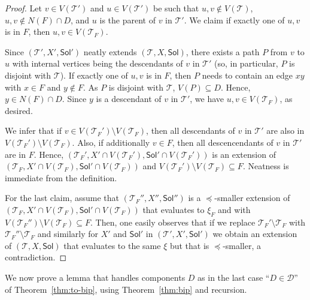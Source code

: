 \documentclass[11pt,a4paper]{article}
\theoremstyle{definition}
\def\T{\mathcal{T}}
\def\Sol{\mathsf{Sol}}
\begin{document}
 \begin{proof}
 Let $v \in V(\T')$ and $u \in V(\T')$ be such that $u,v \notin V(\T)$,
 $u,v \notin N(F) \cap D$, and $u$ is the parent of $v$ in $\T'$. 
 We claim if exactly one of $u,v$ is in $F$, then $u,v \in V(\T_F)$. 

 Since $(\T',X',\Sol')$ neatly extends $(\T,X,\Sol)$,
 there exists a path $P$ from $v$ to $u$ with internal vertices
 being the descendants of $v$ in $\T'$ (so, in particular, $P$ is disjoint
     with $\T$). 
 If exactly one of $u,v$ is in $F$, then $P$ needs to contain an edge
 $xy$ with $x \in F$ and $y \notin F$. As $P$ is disjoint with $\T$,
 $V(P) \subseteq D$. Hence, $y \in N(F) \cap D$. 
 Since $y$ is a descendant of $v$ in $\T'$, we have $u,v \in V(\T_F)$, as desired.
 
 We infer that if $v \in V(\T_F') \setminus V(\T_F)$, then all descendants
 of $v$ in $\T'$ are also in $V(\T_F') \setminus V(\T_F)$. 
 Also, if additionally $v \in F$, then all descencendants of $v$ in $\T'$ are in $F$.
 Hence, $(\T_F', X' \cap V(\T_F'), \Sol' \cap V(\T_F'))$ is an extension
 of $(\T_F, X' \cap V(\T_F), \Sol' \cap V(\T_F))$
 and $V(\T_F') \setminus V(\T_F) \subseteq F$.
 Neatness is immediate from the definition.
 
 For the last claim, assume that $(\T_F'', X'', \Sol'')$ is a $\preceq$-smaller
 extension of $(\T_F, X' \cap V(\T_F), \Sol' \cap V(\T_F))$ that evaluates to $\xi_F$
 and with $V(\T_F'') \setminus V(\T_F) \subseteq F$. 
 Then, one easily observes that if we replace $\T_F' \setminus \T_F$ with $\T_F'' \setminus \T_F$
and similarly for $X'$ and $\Sol'$ in $(\T',X',\Sol')$ we obtain an extension
of $(\T,X,\Sol)$ that evaluates to the same $\xi$ but
that is $\preceq$-smaller, a contradiction.
 \end{proof}

We now prove a lemma that handles components $D$ as in the last case ``$D \in \mathcal{D}$''
of Theorem~\ref{thm:to-bip}, using Theorem~\ref{thm:bip} and recursion. 
\end{document}

